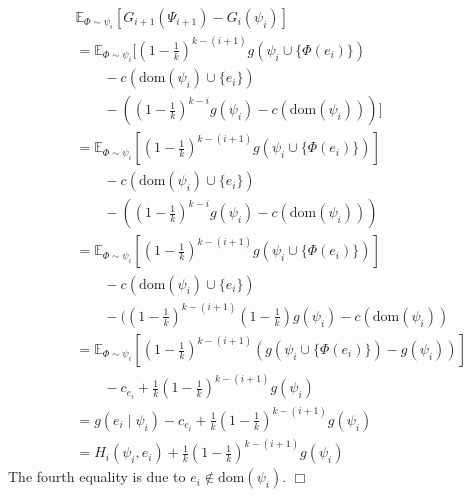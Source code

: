 \documentclass[twoside,leqno,twocolumn]{article}
\begin{document}
\begin{eqnarray*}
&&\mathbb{E}_{\Phi\sim \psi_i}[G_{i+1}(\Psi_{i+1})- G_{i}(\psi_i)]\\
&& = \mathbb{E}_{\Phi\sim \psi_i}[(1-\frac{1}{k})^{k-(i+1)} g(\psi_i\cup \{\Phi(e_i)\})\\
&&\quad\quad-c(\textrm{dom}(\psi_i)\cup\{e_i\}) \\
&&\quad\quad- ((1-\frac{1}{k})^{k-i} g(\psi_i)-c(\textrm{dom}(\psi_i)))]\\
&& = \mathbb{E}_{\Phi\sim \psi_i}[(1-\frac{1}{k})^{k-(i+1)} g(\psi_i\cup \{\Phi(e_i)\})]\\
&&\quad\quad-c(\textrm{dom}(\psi_i)\cup\{e_i\})\\
&&\quad\quad- ((1-\frac{1}{k})^{k-i} g(\psi_i)-c(\textrm{dom}(\psi_i)))\\
&& = \mathbb{E}_{\Phi\sim \psi_i}[(1-\frac{1}{k})^{k-(i+1)} g(\psi_i\cup \{\Phi(e_i)\})]\\
&&\quad\quad -c(\textrm{dom}(\psi_i) \cup\{e_i\})\\
&&\quad\quad- ((1-\frac{1}{k})^{k-(i+1)} (1-\frac{1}{k}) g(\psi_i)-c(\textrm{dom}(\psi_i))\\
&& =  \mathbb{E}_{\Phi\sim \psi_i}[(1-\frac{1}{k})^{k-(i+1)} (g(\psi_i\cup \{\Phi(e_i)\}) -  g(\psi_i))]\\
 &&\quad\quad - c_{e_i} + \frac{1}{k}(1-\frac{1}{k})^{k-(i+1)}g(\psi_i)\\
 && = g(e_i\mid \psi_i) - c_{e_i} + \frac{1}{k}(1-\frac{1}{k})^{k-(i+1)}g(\psi_i)\\
&& = H_i(\psi_i, e_i)+\frac{1}{k}(1-\frac{1}{k})^{k-(i+1)} g(\psi_i)
\end{eqnarray*} The fourth equality is due to $e_i\notin \textrm{dom}(\psi_i)$. $\Box$
\end{document}
